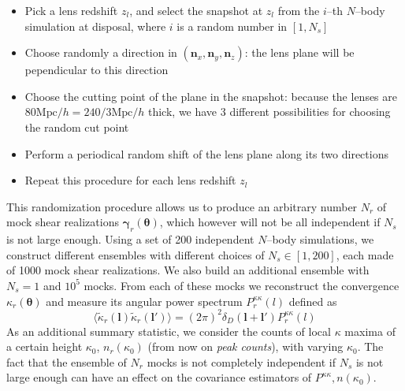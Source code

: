 \documentclass[reprint,aps,prd,superscriptaddress,showkeys,showpacs]{revtex4-1}
\newcommand{\bb}[1]{\mathbf{#1}}
\begin{document}
\begin{itemize}
\item Pick a lens redshift $z_l$, and select the snapshot at $z_l$ from the $i$--th $N$--body simulation at disposal, where $i$ is a random number in $[1,N_s]$
\item Choose randomly a direction in $(\bb{n}_x,\bb{n}_y,\bb{n}_z)$: the lens plane will be pependicular to this direction
\item Choose the cutting point of the plane in the snapshot: because the lenses are $80\mathrm{Mpc}/h=240/3\mathrm{Mpc}/h$ thick, we have 3 different possibilities for choosing the random cut point
\item Perform a periodical random shift of the lens plane along its two directions
\item Repeat this procedure for each lens redshift $z_l$  
\end{itemize}  
%
This randomization procedure allows us to produce an arbitrary number $N_r$ of mock shear realizations $\pmb{\gamma}_r(\pmb{\theta})$, which however will not be all independent if $N_s$ is not large enough. Using a set of 200 independent $N$--body simulations, we construct different ensembles with different choices of $N_s\in[1,200]$, each made of 1000 mock shear realizations. We also build an additional ensemble with $N_s=1$ and $10^5$ mocks. From each of these mocks we reconstruct the convergence $\kappa_r(\pmb{\theta})$ and measure its angular power spectrum $P^{\kappa\kappa}_r(l)$ defined as
\begin{equation}
\langle\tilde{\kappa}_r(\bb{l})\tilde{\kappa}_r(\bb{l}')\rangle = (2\pi)^2\delta_D(\bb{l}+\bb{l}')P^{\kappa\kappa}_r(l)
\end{equation}
%
As an additional summary statistic, we consider the counts of local $\kappa$ maxima of a certain height $\kappa_0$, $n_r(\kappa_0)$ (from now on \textit{peak counts}), with varying $\kappa_0$. The fact that the ensemble of $N_r$ mocks is not completely independent if $N_s$ is not large enough can have an effect on the covariance estimators of $P^{\kappa\kappa},n(\kappa_0)$. 

\end{document}
